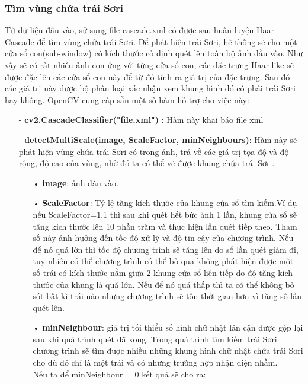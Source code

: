 \documentclass[12pt,a4paper]{article}
\begin{document}
\subsubsection{Tìm vùng chứa trái Sơri}
Từ dữ liệu đầu vào, sử sụng file cascade.xml có được sau huấn luyện Haar Cascade để tìm vùng chứa trái Sơri. Để phát hiện trái Sơri, hệ thống sẽ cho một cửa sổ con(sub-window) có kích thước cố định quét lên toàn bộ ảnh đầu vào. Như vậy sẽ có rất nhiều ảnh con ứng với từng cửa sổ con, các đặc trưng Haar-like sẽ được đặc lên các cửa sổ con này để từ đó tính ra giá trị của đặc trưng. Sau đó các giá trị này được bộ phân loại xác nhận xem khung hình đó có phải trái Sơri hay không. OpenCV cung cấp sẵn một số hàm hỗ trợ cho việc này:\\
\begin{itemize}
\item[-] \textbf{cv2.CascadeClassifier("file.xml")} : Hàm này khai báo file xml
\item[-] \textbf{detectMultiScale(image, ScaleFactor, minNeighbours)}: Hàm này sẽ phát hiện vùng chứa trái Sơri có trong ảnh, trả về các giá trị tọa độ và độ rộng, độ cao của vùng, nhờ đó ta có thể vẽ được khung chứa trái Sơri.
\begin{itemize}
\item[•] \textbf{image}: ảnh đầu vào.
\item[•] \textbf{ScaleFactor}: Tỷ lệ tăng kích thước của khung cửa sổ tìm kiếm.Ví dụ nếu ScaleFactor=1.1 thì sau khi quét hết bức ảnh 1 lần, khung cửa sổ sẽ tăng kich thước lên 10 phần trăm và thực hiện lần quét tiếp theo. Tham số này ảnh hưởng đến tốc độ xử lý và độ tin cậy của chương trình. Nếu để nó quá lớn thì tốc độ chương trình sẽ tăng lên do số lần quét giảm đi, tuy nhiên có thể chương trình có thể bỏ qua không phát hiện được một số trái có kích thước nằm giữa 2 khung cửa sổ liên tiếp do độ tăng kích thước của khung là quá lớn. Nếu để nó quá thấp thì ta có thể không bỏ sót bất kì trái nào nhưng chương trình sẽ tốn thời gian hơn vì tăng số lần quét lên.
\pagebreak
\item[•] \textbf{minNeighbour}: giá trị tối thiểu số hình chữ nhật lân cận được gộp lại sau khi quá trình quét đã xong. Trong quá trình tìm kiếm trái Sơri chương trình sẽ tìm được nhiều những khung hình chữ nhật chứa trái Sơri cho dù đó chỉ là một trái và có nhưng trường hợp nhận diện nhầm.\\Nếu ta để minNeighbour = 0 kết quả sẽ cho ra:
\begin{center}
    \begin{figure}[htp]

\end{figure}
\end{center}
\end{itemize}
\end{itemize}
\end{document}
